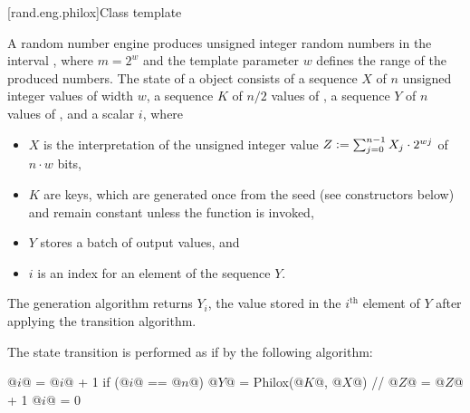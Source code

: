 [rand.eng.philox]{Class template }%
%

\pnum
A  random number engine produces
unsigned integer random numbers in the interval ,
where $m = 2^w$ and
the template parameter $w$ defines the range of the produced numbers.
The state of a  object consists of
a sequence $X$ of $n$ unsigned integer values of width $w$,
a sequence $K$ of $n/2$ values of ,
a sequence $Y$ of $n$ values of , and
a scalar $i$, where
\begin{itemize}
\item
$X$ is the interpretation of the unsigned integer  value
$Z \mathrel{\mathop:}= \sum_{j = 0}^{n - 1} X_j \cdot 2^{wj}$ of $n \cdot w$ bits,
\item
$K$ are keys, which are generated once from the seed (see constructors below)
and remain constant unless the  function is invoked,
\item
$Y$ stores a batch of output values, and
\item
$i$ is an index for an element of the sequence $Y$.
\end{itemize}

\pnum
The generation algorithm returns $Y_i$,
the value stored in the $i^\text{th}$ element of $Y$ after applying
the transition algorithm.

\pnum
The state transition is performed as if by the following algorithm:
\begin{codeblock}
@$i$@ = @$i$@ + 1
if (@$i$@ == @$n$@) {
  @$Y$@ = Philox(@$K$@, @$X$@) // \seebelow
  @$Z$@ = @$Z$@ + 1
  @$i$@ = 0
}
\end{codeblock}

